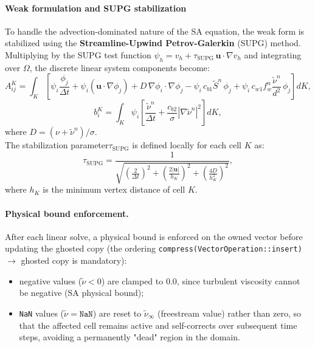 \paragraph{Weak formulation and SUPG stabilization}

To handle the advection-dominated nature of the SA equation, the weak form is stabilized using the \textbf{Streamline-Upwind Petrov-Galerkin} (SUPG) method.\\

Multiplying by the SUPG test function $\psi_h = v_h + \tau_\text{SUPG}\,\mathbf{u}\cdot\nabla v_h$ and integrating over $\Omega$, the discrete linear system components become:
\[
  A^K_{ij} = \int_K \!\left[
    \psi_i \frac{\phi_j}{\Delta t}
    + \psi_i(\mathbf{u}\cdot\nabla\phi_j)
    + D\,\nabla\phi_i\cdot\nabla\phi_j
    - \psi_i\,c_{b1}\tilde{S}^n\,\phi_j
    + \psi_i\,c_{w1}f_w^n\frac{\tilde{\nu}^n}{d^2}\,\phi_j
  \right]dK,
\]
\[
  b^K_i = \int_K \psi_i\!\left[
    \frac{\tilde{\nu}^n}{\Delta t}
    + \frac{c_{b2}}{\sigma}|\nabla\tilde{\nu}^n|^2
  \right]dK,
\]
where $D = (\nu+\tilde{\nu}^n)/\sigma$.\\

The stabilization parameter$ \tau_\text{SUPG}$ is defined locally for each cell $K$ as:
\[
  \tau_\text{SUPG} = \frac{1}{\displaystyle\sqrt{
    \left(\frac{2}{\Delta t}\right)^{\!2}
    +\left(\frac{2|\mathbf{u}|}{h_K}\right)^{\!2}
    +\left(\frac{4D}{h_K^2}\right)^{\!2}
  }},
\]
where $h_K$ is the minimum vertex distance of cell $K$.\\

\paragraph{Physical bound enforcement.}

After each linear solve, a physical bound is enforced on the owned vector before updating the ghosted copy (the ordering \texttt{compress(VectorOperation::insert)} $\to$ ghosted copy is mandatory):
\begin{itemize}
  \item[-] negative values ($\tilde{\nu} < 0$) are clamped to $0.0$, since turbulent viscosity cannot be negative (SA physical bound);
  \item[-] \texttt{NaN} values ($\tilde{\nu} = \texttt{NaN}$) are reset to $\tilde{\nu}_\infty$ (freestream value) rather than zero, so that the affected cell remains active and self-corrects over subsequent time steps, avoiding a permanently "dead" region in the domain.
\end{itemize}

